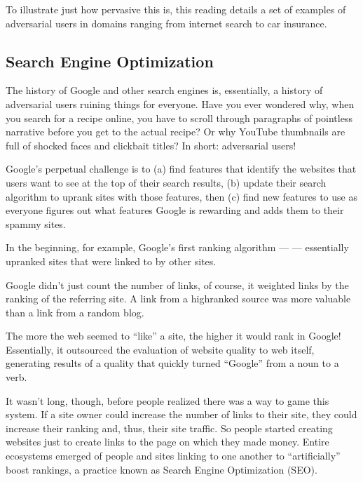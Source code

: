 \documentclass[letterpaper,10pt,english]{jupyterBook}
\begin{document}
\sphinxAtStartPar
To illustrate just how pervasive this is, this reading details a set of examples of adversarial users in domains ranging from internet search to car insurance.


\subsection{Search Engine Optimization}
\label{\detokenize{30_questions/29_passive_external_adversarial_users_examples:search-engine-optimization}}
\sphinxAtStartPar
The history of Google and other search engines is, essentially, a history of adversarial users ruining things for everyone. Have you ever wondered why, when you search for a recipe online, you have to scroll through paragraphs of pointless narrative before you get to the actual recipe? Or why YouTube thumbnails are full of shocked faces and clickbait titles? In short: adversarial users!

\sphinxAtStartPar
Google’s perpetual challenge is to (a) find features that identify the websites that users want to see at the top of their search results, (b) update their search algorithm to up\sphinxhyphen{}rank sites with those features, then (c) find new features to use as everyone figures out what features Google is rewarding and adds them to their spammy sites.

\sphinxAtStartPar
In the beginning, for example, Google’s first ranking algorithm —  — essentially up\sphinxhyphen{}ranked sites that were linked to by other sites.%
\begin{footnote}[1]\sphinxAtStartFootnote
Google didn’t just count the number of links, of course, it weighted links by the ranking of the referring site. A link from a high\sphinxhyphen{}ranked source was more valuable than a link from a random blog.
%
\end{footnote} The more the web seemed to “like” a site, the higher it would rank in Google! Essentially, it outsourced the evaluation of website quality to web itself, generating results of a quality that quickly turned “Google” from a noun to a verb.

\sphinxAtStartPar
It wasn’t long, though, before people realized there was a way to game this system. If a site owner could increase the number of links to their site, they could increase their ranking and, thus, their site traffic. So people started creating websites just to create links to the page on which they made money. Entire ecosystems emerged of people and sites linking to one another to “artificially” boost rankings, a practice known as Search Engine Optimization (SEO).
\end{document}
